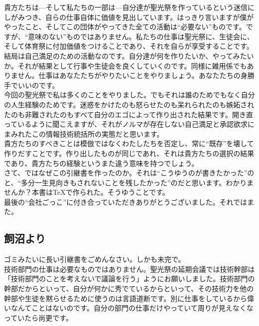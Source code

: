 \documentclass[dvipdfmx,jb5]{jreport}
\begin{document}
貴方たちは---そして私たちの一部は---自分達が聖光祭を作っているという迷信にしがみつき、自らの仕事自体に価値を見出しています。はっきり言いますが僕がやったこと、そしてこの団体がやってきた全ての活動は``必要ない''ものです。ですが、``意味のない''ものではありません。私たちの仕事は聖光祭に、生徒会に、そして体育祭に付加価値をつけることであり、それを自らが享受することです。
\\

結局は自己満足のための活動なのです。自分達が何を作りたいか、やってみたいか。それが結果として行事や生徒会を良くしていくのです。同様に雑用係でもありません。仕事はあなたたちがやりたいことをやりましょう。あなたたちの身勝手でいいのです。
\\

今回の聖光祭で私は多くのことをやりました。でもそれは誰のためでもなく自分の人生経験のためです。迷惑をかけたのも怒らせたのも呆れられたのも嫉妬されたのも非難されたのもすべて自分のエゴによって作り出された結果です。開き直っているように聞こえますが、それがノルマが存在しない自己満足と承認欲求にまみれたこの情報技術統括所の実態だと思います。
\\

貴方たちのすべきことは模倣ではなくわたしたちを否定し、常に``既存''を壊して作りだすことです。作り出したものが同じであれ、それは貴方たちの選択の結果であり、貴方たちの経験というまた違う意味を持つでしょう。
\\

さて、ではなぜこの引継書を作ったのか。それは``こうゆうのが書きたかった''のと、``多分一生見向きもされないことを残したかった''のだと思います。わかりませんか？本書は\TeX で作られた。そうゆうことです。
\\

最後の``会社ごっこ''に付き合っていただきありがとうございました。それではまた。
\subsection{飼沼より}
ゴミみたいに長い引継書をごめんなさい。しかも未完で。
\\

技術部門の仕事は必要なものではありません。聖光祭の延期会議では技術幹部は「技術部門のことを考えないで議論を行う」ようにお願いしました。技術部門の幹部だからといって、自分が何かに秀でているからといって、その技術力を他の幹部や生徒を黙らせるために使うのは言語道断です。別に仕事をしているから偉いなんてことはないのです。自分の部門の仕事だけやっていて周りが見えなくなっていたら尚更です。
\\
\end{document}
